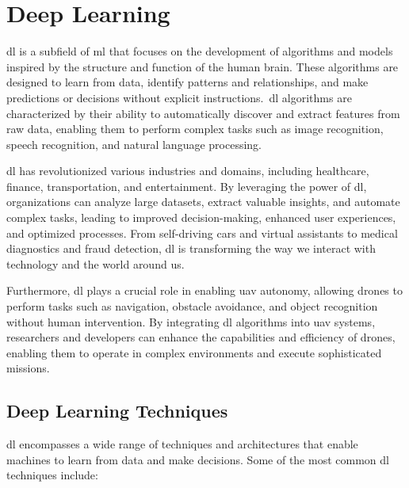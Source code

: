 \chapter{Deep Learning}\label{ch:deep_learning}

\gls{dl} is a subfield of \gls{ml} that focuses on the development of algorithms and models inspired by the structure and function of the human brain. These algorithms are designed to learn from data, identify patterns and relationships, and make predictions or decisions without explicit instructions.\ \gls{dl} algorithms are characterized by their ability to automatically discover and extract features from raw data, enabling them to perform complex tasks such as image recognition, speech recognition, and natural language processing.

\gls{dl} has revolutionized various industries and domains, including healthcare, finance, transportation, and entertainment. By leveraging the power of \gls{dl}, organizations can analyze large datasets, extract valuable insights, and automate complex tasks, leading to improved decision-making, enhanced user experiences, and optimized processes. From self-driving cars and virtual assistants to medical diagnostics and fraud detection, \gls{dl} is transforming the way we interact with technology and the world around us.

Furthermore, \gls{dl} plays a crucial role in enabling \gls{uav} autonomy, allowing drones to perform tasks such as navigation, obstacle avoidance, and object recognition without human intervention. By integrating \gls{dl} algorithms into \gls{uav} systems, researchers and developers can enhance the capabilities and efficiency of drones, enabling them to operate in complex environments and execute sophisticated missions.

\section{Deep Learning Techniques}

\gls{dl} encompasses a wide range of techniques and architectures that enable machines to learn from data and make decisions. Some of the most common \gls{dl} techniques include:

